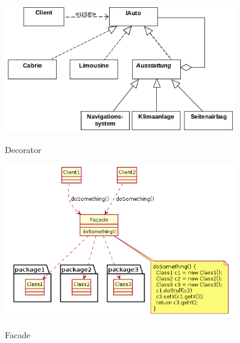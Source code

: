 \begin{figure}[htb]
    \centering
    \begin{minipage}[t]{0.45\linewidth}
		\centering
		\includegraphics[width=0.9\textwidth]{images/decorator}
		\label{fig:decorator}
		\caption{Decorator}
	\end{minipage}%
	\hfill
    \begin{minipage}[t]{0.45\linewidth}
		\centering
		\includegraphics[width=0.9\textwidth]{images/facade}
		\label{fig:facade}
		\caption{Facade}
	\end{minipage}
\end{figure}

